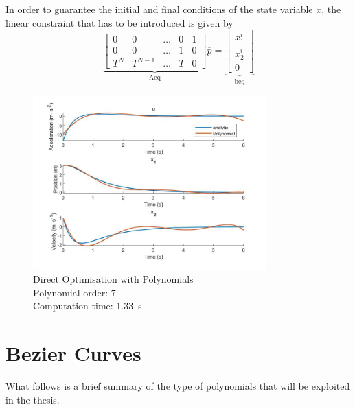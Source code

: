 \par In order to guarantee the initial and final conditions of the state variable $x$, the linear constraint that has to be introduced is given by
\begin{equation}
    \label{eq:pol_equality}
    \underbrace{\begin{bmatrix}
    0 & 0 & \dots & 0 & 1 \\
    0 & 0 & \dots & 1 & 0 \\
    T^N & T^{N-1} & \dots & T & 0 
    \end{bmatrix}}_\text{Aeq} \overline{p}  =
    \underbrace{\begin{bmatrix} x_1^i \\ x_2^i        \\ 0 \end{bmatrix}}_\text{beq}
\end{equation}


\begin{figure}[h!]
\centering
\includegraphics[width=0.8\textwidth]{Images/solution_pol.jpg}
\caption{Direct Optimisation with Polynomials \\ Polynomial order: 7 \\
Computation time: \SI{1.33}{\second}}
\label{fig:solution_pol}
\end{figure}



\section{Bezier Curves}
\label{sec:bezcurves}

\par What follows is a brief summary of the type of polynomials that will be exploited in the thesis.


